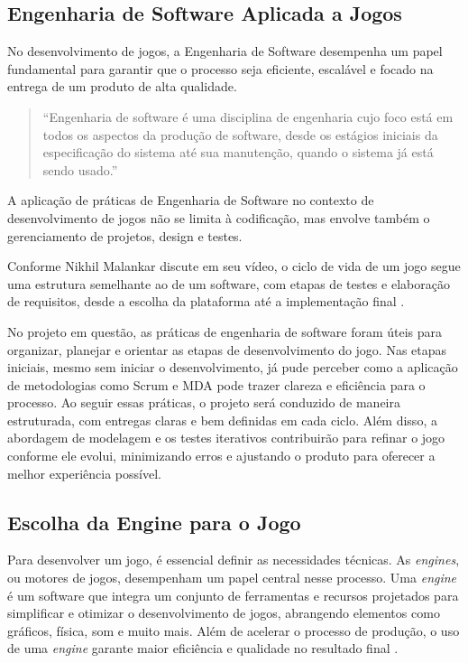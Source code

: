 \subsection{Engenharia de Software Aplicada a Jogos}

No desenvolvimento de jogos, a Engenharia de Software desempenha um papel fundamental para garantir que o processo seja eficiente, escalável e focado na entrega de um produto de alta qualidade.

\begin{quote}
\small
``Engenharia de software é uma disciplina de engenharia cujo foco está em todos os aspectos da produção de software, desde os estágios iniciais da especificação do sistema até sua manutenção, quando o sistema já está sendo usado.'' \cite{sommerville2011}
\end{quote}

A aplicação de práticas de Engenharia de Software no contexto de desenvolvimento de jogos não se limita à codificação, mas envolve também o gerenciamento de projetos, design e testes.

Conforme Nikhil Malankar discute em seu vídeo, o ciclo de vida de um jogo segue uma estrutura semelhante ao de um software, com etapas de testes e elaboração de requisitos, desde a escolha da plataforma até a implementação final \cite{malankar2023}.

No projeto em questão, as práticas de engenharia de software foram úteis para organizar, planejar e orientar as etapas de desenvolvimento do jogo. Nas etapas iniciais, mesmo sem iniciar o desenvolvimento, já pude perceber como a aplicação de metodologias como Scrum e MDA pode trazer clareza e eficiência para o processo. Ao seguir essas práticas, o projeto será conduzido de maneira estruturada, com entregas claras e bem definidas em cada ciclo. Além disso, a abordagem de modelagem e os testes iterativos contribuirão para refinar o jogo conforme ele evolui, minimizando erros e ajustando o produto para oferecer a melhor experiência possível.

\subsection{Escolha da Engine para o Jogo}

Para desenvolver um jogo, é essencial definir as necessidades técnicas. As \textit{engines}, ou motores de jogos, desempenham um papel central nesse processo. Uma \textit{engine} é um software que integra um conjunto de ferramentas e recursos projetados para simplificar e otimizar o desenvolvimento de jogos, abrangendo elementos como gráficos, física, som e muito mais. Além de acelerar o processo de produção, o uso de uma \textit{engine} garante maior eficiência e qualidade no resultado final \cite{pixstudios}.

